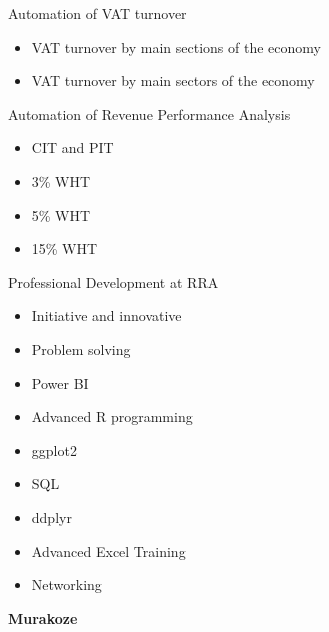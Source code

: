\documentclass[ignorenonframetext,]{beamer}
\providecommand{\tightlist}{%
  \setlength{\itemsep}{0pt}\setlength{\parskip}{0pt}}
\begin{document}
\begin{frame}{Automation of VAT turnover}

\begin{itemize}
\tightlist
\item
  VAT turnover by main sections of the economy
\item
  VAT turnover by main sectors of the economy
\end{itemize}

\end{frame}

\begin{frame}{Automation of Revenue Performance Analysis}

\begin{itemize}
\tightlist
\item
  CIT and PIT
\item
  3\% WHT
\item
  5\% WHT
\item
  15\% WHT
\end{itemize}

\end{frame}

\begin{frame}{Professional Development at RRA}

\begin{itemize}
\tightlist
\item
  Initiative and innovative
\item
  Problem solving
\item
  Power BI
\item
  Advanced R programming
\item
  ggplot2
\item
  SQL
\item
  ddplyr
\item
  Advanced Excel Training
\item
  Networking
\end{itemize}

\end{frame}

\begin{frame}{}

\begin{center}
\textbf{Murakoze}
\end{center}

\end{frame}
\end{document}
